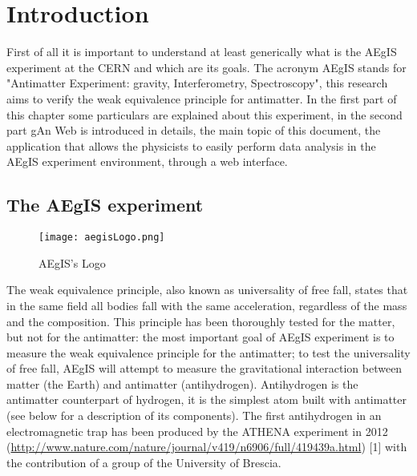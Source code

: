 
\chapter{Introduction} %

\label{Chapter1} %


First of all it is important to understand at least generically what is the AEgIS experiment at the CERN and which are its goals. The acronym AEgIS stands for "Antimatter Experiment: gravity, Interferometry, Spectroscopy", this research aims to verify the weak equivalence principle for antimatter. In the first part of this chapter some particulars are explained about this experiment, in the second part gAn Web is introduced in details, the main topic of this document, the application that allows the physicists to easily perform data analysis in the AEgIS experiment environment, through a web interface. 

\section{The AEgIS experiment}


\begin{figure}[H]
\centering
\texttt{[image: aegisLogo.png]} 
\caption{AEgIS's Logo}
\end{figure}

The weak equivalence principle, also known as universality of free fall, states that in the same field all bodies fall with the same acceleration, regardless of the mass and the composition. This principle has been thoroughly tested for the matter, but not for the antimatter: the most important goal of AEgIS experiment is to measure the weak equivalence principle for the antimatter; to test the universality of free fall, AEgIS will attempt to measure the gravitational interaction between matter (the Earth) and antimatter (antihydrogen). Antihydrogen is the antimatter counterpart of hydrogen, it is the simplest atom built with antimatter (see below for a description of its components). The first antihydrogen in an electromagnetic trap has been produced by the ATHENA experiment in 2012 (\url{http://www.nature.com/nature/journal/v419/n6906/full/419439a.html}) [1]
with the contribution of a group of the University of Brescia.

